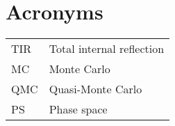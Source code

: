 
\chapter*{Acronyms}
\begin{tabular}{l l}
TIR &{Total internal reflection}\\
MC &{Monte Carlo}\\
QMC &{Quasi-Monte Carlo}\\
PS &{Phase space}
\end{tabular}

